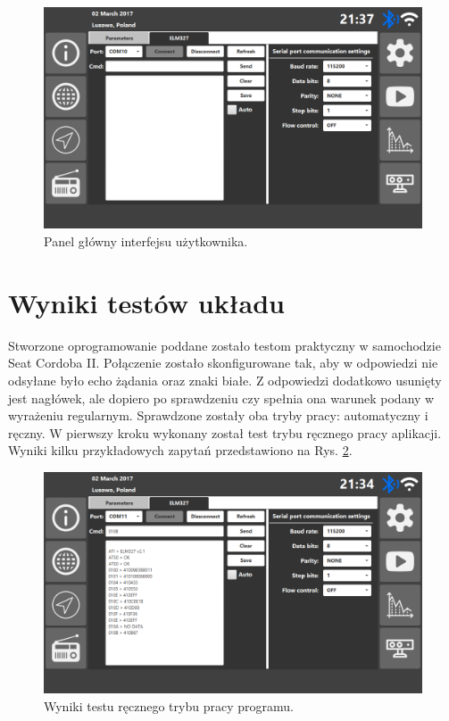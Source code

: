 \documentclass[12pt]{article} %
\numberwithin{equation}{subsection}
\numberwithin{figure}{section}
\numberwithin{table}{section}
\begin{document}
		\begin{figure}[!h]
			\centering
			\includegraphics[scale=0.55]{Images/user_interface_settings_elm_tab.png}
			\caption{Panel główny interfejsu użytkownika.}
			\label{user_interface_dashboard}
		\end{figure}
	
	
	\newpage
	
	\section{Wyniki testów układu}	
	
	\hspace{0.5cm}Stworzone oprogramowanie poddane zostało testom praktyczny w samochodzie Seat Cordoba II. Połączenie zostało skonfigurowane tak, aby w odpowiedzi nie odsyłane było echo żądania oraz znaki białe. Z odpowiedzi dodatkowo usunięty jest nagłówek, ale dopiero po sprawdzeniu czy spełnia ona warunek podany w wyrażeniu regularnym. Sprawdzone zostały oba tryby pracy: automatyczny i ręczny. W pierwszy kroku wykonany został test trybu ręcznego pracy aplikacji. Wyniki kilku przykładowych zapytań przedstawiono na Rys. \ref{rys_wyniki_testu_recznego}.
	
		\begin{figure}[!h]
			\centering
			\includegraphics[scale=0.55]{Images/rys_test_reczny.png}
			\caption{Wyniki testu ręcznego trybu pracy programu.}
			\label{rys_wyniki_testu_recznego}
		\end{figure}
		
\end{document}
